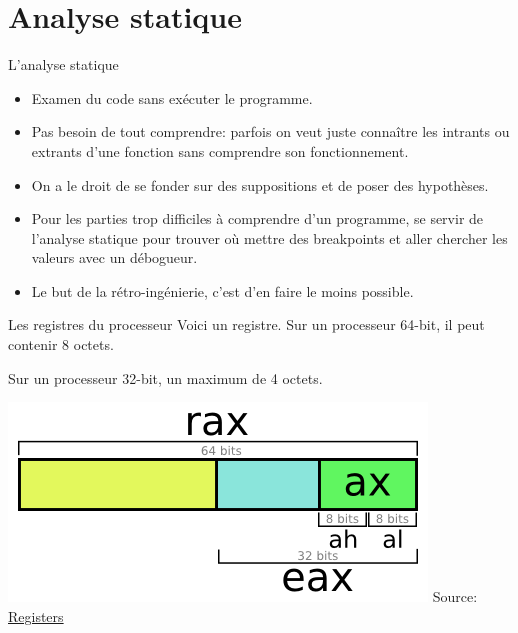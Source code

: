 \documentclass[10pt,xcolor={table,dvipsnames},t]{beamer}
\begin{document}
\section{Analyse statique}

\begin{frame}{L'analyse statique}

\begin{itemize}
    \item Examen du code sans exécuter le programme.
    \item Pas besoin de tout comprendre: parfois on veut juste connaître les intrants ou extrants d'une fonction sans comprendre son fonctionnement.
    \item On a le droit de se fonder sur des suppositions et de poser des hypothèses.
    \item Pour les parties trop difficiles à comprendre d'un programme, se servir de l'analyse statique pour trouver où mettre des breakpoints et aller chercher les valeurs avec un débogueur. 
    \item Le but de la rétro-ingénierie, c'est d'en faire le moins possible.
\end{itemize}


\end{frame}



\begin{frame}{Les registres du processeur}
    Voici un registre. Sur un processeur 64-bit, il peut contenir 8 octets. 
    
    Sur un processeur 32-bit, un maximum de 4 octets. 
    
    \begin{center}
    \includegraphics[width=.60\textwidth,height=.40\textheight]{Register}\newline{}
    Source: \href{http://blog.jpauli.tech/2016-11-30-on-c-performances-html/}{Registers}
    \end{center}
\end{frame}
\end{document}

